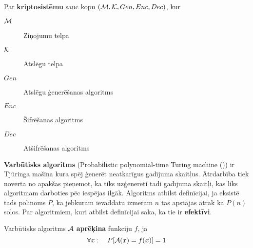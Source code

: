 Par \textbf{kriptosistēmu} sauc kopu $(\mathcal{M}, \mathcal{K}, Gen, Enc, Dec)$, kur
\begin{description}
    \item[$\mathcal{M}$]Ziņojumu telpa
    \item[$\mathcal{K}$]Atslēgu telpa
    \item[$Gen$]Atslēgu ģenerēšanas algoritms
    \item[$Enc$]Šifrēšanas algoritms
    \item[$Dec$]Atšifrēšanas algoritms
\end{description}

\textbf{Varbūtisks algoritms} (Probabilistic polynomial-time Turing machine \mbox{(\ppt))} ir Tjūringa mašīna kura spēj ģenerēt neatkarīgus gadījuma skaitļus. Ātrdarbība tiek novērta no apakšas pieņemot, ka tiks uzģenerēti tādi gadījuma skaitļi, kas liks algoritmam darboties pēc iespējas ilgāk. Algoritms atbilst definīcijai, ja eksistē tāds polinoms $P$, ka jebkuram ievaddatu izmēram $n$ tas apstājas ātrāk kā $P(n)$ soļos. Par algoritmiem, kuri atbilst definīcijai saka, ka tie ir \textbf{efektīvi}.

Varbūtisks algoritms $\mathcal{A}$ \textbf{aprēķina} funkciju $f$, ja 
$$ \forall x : \quad P[\mathcal{A}(x) = f(x)] = 1 $$




